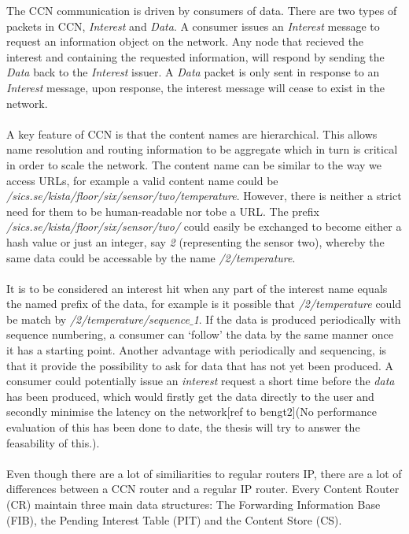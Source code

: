 The CCN communication is driven by consumers of data. There are two types of packets in CCN, \textit{Interest} and \textit{Data}. A consumer issues an \textit{Interest} message to request an information object on the network. Any node that recieved the interest and containing the requested information, will respond by sending the \textit{Data} back to the \textit{Interest} issuer. A \textit{Data} packet is only sent in response to an \textit{Interest} message, upon response, the interest message will cease to exist in the network.
\\\\
A key feature of CCN is that the content names are hierarchical. This allows name resolution and routing information to be aggregate which in turn is critical in order to scale the network. The content name can be similar to the way we access URLs, for example a valid content name could be \textit{/sics.se/kista/floor/six/sensor/two/temperature}. However, there is neither a strict need for them to be human-readable nor tobe a URL. The prefix \textit{/sics.se/kista/floor/six/sensor/two/} could easily be exchanged to become either a hash value or just an integer, say \textit{2} (representing the sensor two), whereby the same data could be accessable by the name \textit{/2/temperature}.
\\\\
It is to be considered an interest hit when any part of the interest name equals the named prefix of the data, for example is it possible that \textit{/2/temperature} could be match by \textit{/2/temperature/sequence$\_$1}. If the data is produced periodically with sequence numbering, a consumer can `follow' the data by the same manner once it has a starting point. Another advantage with periodically and sequencing, is that it provide the possibility to ask for data that has not yet been produced. A consumer could potentially issue an \textit{interest} request a short time before the \textit{data} has been produced, which would firstly get the data directly to the user and secondly minimise the latency on the network[ref to bengt2](No performance evaluation of this has been done to date, the thesis will try to answer the feasability of this.). 
\\\\
Even though there are a lot of similiarities to regular routers IP, there are a lot of differences between a CCN router and a regular IP router.
Every Content Router (CR) maintain three main data structures: The Forwarding Information Base (FIB), the Pending Interest Table (PIT) and the Content Store (CS).

